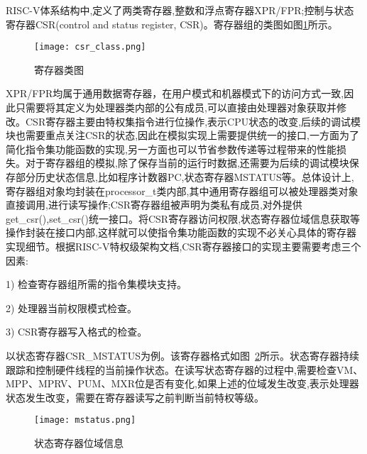 RISC-V体系结构中,定义了两类寄存器,整数和浮点寄存器XPR/FPR;控制与状态寄存器CSR(control and status register, CSR)。寄存器组的类图如图\ref{fig:csr_class}所示。
\begin{figure}[H]
    \centering
    \texttt{[image: csr\_class.png]}
    \caption{寄存器类图}
    \label{fig:csr_class}
\end{figure}


XPR/FPR均属于通用数据寄存器，在用户模式和机器模式下的访问方式一致,因此只需要将其定义为处理器类内部的公有成员,可以直接由处理器对象获取并修改。CSR寄存器主要由特权集指令进行位操作,表示CPU状态的改变,后续的调试模块也需要重点关注CSR的状态,因此在模拟实现上需要提供统一的接口,一方面为了简化指令集功能函数的实现,另一方面也可以节省参数传递等过程带来的性能损失。对于寄存器组的模拟,除了保存当前的运行时数据,还需要为后续的调试模块保存部分历史状态信息,比如程序计数器PC,状态寄存器MSTATUS等。总体设计上,寄存器组对象均封装在processor\_t类内部,其中通用寄存器组可以被处理器类对象直接调用,进行读写操作;CSR寄存器组被声明为类私有成员,对外提供get\_csr(),set\_csr()统一接口。将CSR寄存器访问权限,状态寄存器位域信息获取等操作封装在接口内部,这样就可以使指令集功能函数的实现不必关心具体的寄存器实现细节。根据RISC-V特权级架构文档,CSR寄存器接口的实现主要需要考虑三个因素:


1) 检查寄存器组所需的指令集模块支持。


2) 处理器当前权限模式检查。


3) CSR寄存器写入格式的检查。


以状态寄存器CSR\_MSTATUS为例。该寄存器格式如图~\ref{fig:mstatus}所示。状态寄存器持续跟踪和控制硬件线程的当前操作状态。在读写状态寄存器的过程中,需要检查VM、MPP、MPRV、PUM、MXR位是否有变化,如果上述的位域发生改变,表示处理器状态发生改变，需要在寄存器读写之前判断当前特权等级。
\begin{figure}[H]
    \centering
    \texttt{[image: mstatus.png]}
    \caption{状态寄存器位域信息}
    \label{fig:mstatus}
\end{figure}


